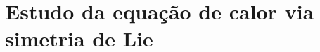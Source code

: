 \chapter[Estudo da equação de calor via simetria de Lie]{Estudo  da equação de calor via simetria de Lie}
